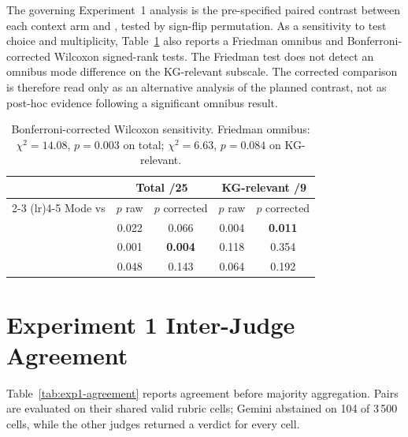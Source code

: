 The governing Experiment~1 analysis is the pre-specified paired contrast
between each context arm and \baseline{}, tested by sign-flip permutation.
As a sensitivity to test choice and multiplicity, Table~\ref{tab:exp1-corrected}
also reports a Friedman omnibus and Bonferroni-corrected Wilcoxon signed-rank
tests. The Friedman test does not detect an omnibus mode difference on the
KG-relevant subscale. The corrected \kg{} comparison is therefore read only as
an alternative analysis of the planned contrast, not as post-hoc evidence
following a significant omnibus result.

\begin{table}[htbp]
    \centering
    \caption{Bonferroni-corrected Wilcoxon sensitivity. Friedman omnibus:
             $\chi^2 = 14.08$, $p = 0.003$ on total;
             $\chi^2 = 6.63$, $p = 0.084$ on KG-relevant.}
    \label{tab:exp1-corrected}
    \small
    \begin{tabular}{lcccc}
        \toprule
        & \multicolumn{2}{c}{Total /25} & \multicolumn{2}{c}{KG-relevant /9} \\
        \cmidrule(lr){2-3} \cmidrule(lr){4-5}
        Mode vs \baseline{} & $p$ raw & $p$ corrected & $p$ raw & $p$ corrected \\
        \midrule
        \kg{}     & 0.022 & 0.066 & 0.004 & \textbf{0.011} \\
        \rag{}    & 0.001 & \textbf{0.004} & 0.118 & 0.354 \\
        \hybrid{} & 0.048 & 0.143 & 0.064 & 0.192 \\
        \bottomrule
    \end{tabular}
\end{table}

\section{Experiment 1 Inter-Judge Agreement}
\label{app:supporting-agreement}

Table~\ref{tab:exp1-agreement} reports agreement before majority aggregation.
Pairs are evaluated on their shared valid rubric cells; Gemini abstained on
104 of 3\,500 cells, while the other judges returned a verdict for every cell.

